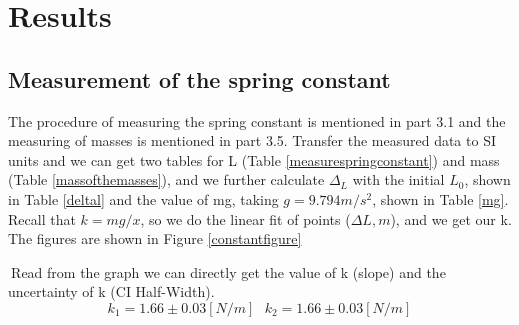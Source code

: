 \documentclass[11pt,a4paper]{article}
\begin{document}
\section{Results}
\subsection{Measurement of the spring constant}
\qquad The procedure of measuring the spring constant is mentioned in part 3.1 and the measuring of masses is mentioned in part 3.5. Transfer the measured data to SI units and we can get two tables for L (Table \ref{measurespringconstant}) and mass (Table \ref{massofthemasses}), and we further calculate $\Delta_L$ with the initial $L_0$, shown in Table \ref{deltal} and the value of mg, taking $g=9.794m/s^2$, shown in Table \ref{mg}. Recall that $k=mg/x$, so we do the linear fit of points ($\Delta L,m$), and we get our k. The figures are shown in Figure \ref{constantfigure}\par
$\ $Read from the graph we can directly get the value of k (slope) and the uncertainty of k (CI Half-Width).
\begin{equation*}
    k_1= 1.66\pm 0.03[N/m]\ \ \ k_2=1.66\pm 0.03[N/m]
\end{equation*}
\end{document}
